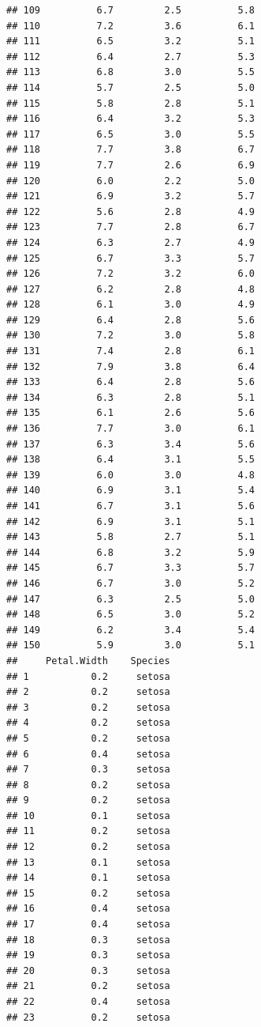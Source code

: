 \documentclass[
]{book}
\begin{document}
\begin{verbatim}
## 109          6.7         2.5          5.8
## 110          7.2         3.6          6.1
## 111          6.5         3.2          5.1
## 112          6.4         2.7          5.3
## 113          6.8         3.0          5.5
## 114          5.7         2.5          5.0
## 115          5.8         2.8          5.1
## 116          6.4         3.2          5.3
## 117          6.5         3.0          5.5
## 118          7.7         3.8          6.7
## 119          7.7         2.6          6.9
## 120          6.0         2.2          5.0
## 121          6.9         3.2          5.7
## 122          5.6         2.8          4.9
## 123          7.7         2.8          6.7
## 124          6.3         2.7          4.9
## 125          6.7         3.3          5.7
## 126          7.2         3.2          6.0
## 127          6.2         2.8          4.8
## 128          6.1         3.0          4.9
## 129          6.4         2.8          5.6
## 130          7.2         3.0          5.8
## 131          7.4         2.8          6.1
## 132          7.9         3.8          6.4
## 133          6.4         2.8          5.6
## 134          6.3         2.8          5.1
## 135          6.1         2.6          5.6
## 136          7.7         3.0          6.1
## 137          6.3         3.4          5.6
## 138          6.4         3.1          5.5
## 139          6.0         3.0          4.8
## 140          6.9         3.1          5.4
## 141          6.7         3.1          5.6
## 142          6.9         3.1          5.1
## 143          5.8         2.7          5.1
## 144          6.8         3.2          5.9
## 145          6.7         3.3          5.7
## 146          6.7         3.0          5.2
## 147          6.3         2.5          5.0
## 148          6.5         3.0          5.2
## 149          6.2         3.4          5.4
## 150          5.9         3.0          5.1
##     Petal.Width    Species
## 1           0.2     setosa
## 2           0.2     setosa
## 3           0.2     setosa
## 4           0.2     setosa
## 5           0.2     setosa
## 6           0.4     setosa
## 7           0.3     setosa
## 8           0.2     setosa
## 9           0.2     setosa
## 10          0.1     setosa
## 11          0.2     setosa
## 12          0.2     setosa
## 13          0.1     setosa
## 14          0.1     setosa
## 15          0.2     setosa
## 16          0.4     setosa
## 17          0.4     setosa
## 18          0.3     setosa
## 19          0.3     setosa
## 20          0.3     setosa
## 21          0.2     setosa
## 22          0.4     setosa
## 23          0.2     setosa

\end{verbatim}
\end{document}
